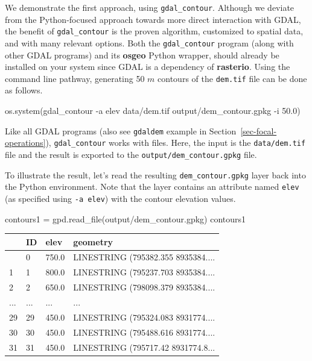 \documentclass[
  letterpaper,
]{krantz}
\newenvironment{Shaded}{\begin{snugshade}}{\end{snugshade}}
\newcommand{\NormalTok}[1]{\textcolor[rgb]{0.00,0.23,0.31}{#1}}
\newcommand{\OperatorTok}[1]{\textcolor[rgb]{0.37,0.37,0.37}{#1}}
\newcommand{\StringTok}[1]{\textcolor[rgb]{0.13,0.47,0.30}{#1}}
\begin{document}
We demonstrate the first approach, using \texttt{gdal\_contour}.
Although we deviate from the Python-focused approach towards more direct
interaction with GDAL, the benefit of \texttt{gdal\_contour} is the
proven algorithm, customized to spatial data, and with many relevant
options. Both the \texttt{gdal\_contour} program (along with other GDAL
programs) and its \textbf{osgeo} Python wrapper, should already be
installed on your system since GDAL is a dependency of
\textbf{rasterio}. Using the command line pathway, generating 50 \(m\)
contours of the \texttt{dem.tif} file can be done as follows.

\begin{Shaded}
\begin{Highlighting}[]
\NormalTok{os.system(}\StringTok{\textquotesingle{}gdal\_contour {-}a elev data/dem.tif output/dem\_contour.gpkg {-}i 50.0\textquotesingle{}}\NormalTok{)}
\end{Highlighting}
\end{Shaded}

Like all GDAL programs (also see \texttt{gdaldem} example in
Section~\ref{sec-focal-operations}), \texttt{gdal\_contour} works with
files. Here, the input is the \texttt{data/dem.tif} file and the result
is exported to the \texttt{output/dem\_contour.gpkg} file.

To illustrate the result, let's read the resulting
\texttt{dem\_contour.gpkg} layer back into the Python environment. Note
that the layer contains an attribute named
\texttt{\textquotesingle{}elev\textquotesingle{}} (as specified using
\texttt{-a\ elev}) with the contour elevation values.

\begin{Shaded}
\begin{Highlighting}[]
\NormalTok{contours1 }\OperatorTok{=}\NormalTok{ gpd.read\_file(}\StringTok{\textquotesingle{}output/dem\_contour.gpkg\textquotesingle{}}\NormalTok{)}
\NormalTok{contours1}
\end{Highlighting}
\end{Shaded}

\begin{longtable}[]{@{}llll@{}}
\toprule\noalign{}
& ID & elev & geometry \\
\midrule\noalign{}
\endhead
\bottomrule\noalign{}
\endlastfoot
0 & 0 & 750.0 & LINESTRING (795382.355 8935384.... \\
1 & 1 & 800.0 & LINESTRING (795237.703 8935384.... \\
2 & 2 & 650.0 & LINESTRING (798098.379 8935384.... \\
... & ... & ... & ... \\
29 & 29 & 450.0 & LINESTRING (795324.083 8931774.... \\
30 & 30 & 450.0 & LINESTRING (795488.616 8931774.... \\
31 & 31 & 450.0 & LINESTRING (795717.42 8931774.8... \\
\end{longtable}
\end{document}
